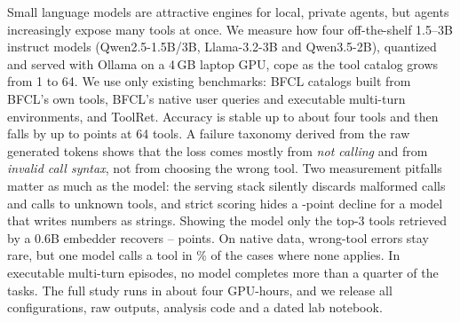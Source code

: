 Small language models are attractive engines for local, private agents, but agents increasingly expose many tools at once.
We measure how four off-the-shelf 1.5--3B instruct models (Qwen2.5-1.5B/3B, Llama-3.2-3B and Qwen3.5-2B), quantized and served with Ollama on a 4\,GB laptop GPU, cope as the tool catalog grows from 1 to 64.
We use only existing benchmarks: BFCL catalogs built from BFCL's own tools, BFCL's native user queries and executable multi-turn environments, and ToolRet.
Accuracy is stable up to about four tools and then falls by up to \DropQwenThree{} points at 64 tools.
A failure taxonomy derived from the raw generated tokens shows that the loss comes mostly from \emph{not calling} and from \emph{invalid call syntax}, not from choosing the wrong tool.
Two measurement pitfalls matter as much as the model: the serving stack silently discards malformed calls and calls to unknown tools, and strict scoring hides a \LenDropLlama-point decline for a model that writes numbers as strings.
Showing the model only the top-3 tools retrieved by a 0.6B embedder recovers \RetGainQwenThreeFive--\RetGainQwenOneFive{} points.
On native data, wrong-tool errors stay rare, but one model calls a tool in \NatAbstInvLlama\% of the cases where none applies. In executable multi-turn episodes, no model completes more than a quarter of the tasks.
The full study runs in about four GPU-hours, and we release all configurations, raw outputs, analysis code and a dated lab notebook.
